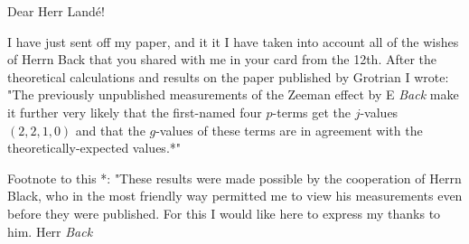 \begin{letter}{82}
\begin{header}
\date{1925/01/15}

\makeheader

\end{header}

Dear Herr Land\'e!

I have just sent off my paper, and it it I have taken into account all of the wishes of Herrn Back that you shared with me in your card from the 12th. After the theoretical calculations and results on the paper published by Grotrian I wrote: "The previously unpublished measurements of the Zeeman effect  by E \textit{Back} make it further very likely that the first-named four $p$-terms get the $j$-values $(2,2,1,0)$ and that the $g$-values of these terms are in agreement with the theoretically-expected values.*"

Footnote to this *: "These results were made possible by the cooperation of Herrn Black, who in the most friendly way permitted me to view his measurements even before they were published. For this I would like here to express my thanks to him. Herr \textit{Back}

\end{letter}